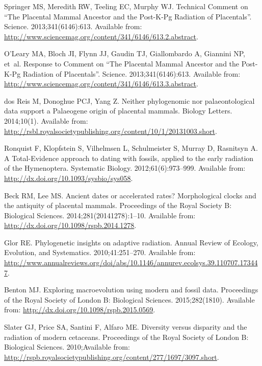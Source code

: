 \documentclass[12pt,letterpaper]{article}
\begin{document}
\begin{thebibliography}{10}
Springer MS, Meredith RW, Teeling EC, Murphy WJ.
\newblock Technical Comment on “The Placental Mammal Ancestor and the
  Post-{K}-{P}g Radiation of Placentals”.
\newblock Science. 2013;341(6146):613.
\newblock Available from:
  \url{http://www.sciencemag.org/content/341/6146/613.2.abstract}.

O'Leary MA, Bloch JI, Flynn JJ, Gaudin TJ, Giallombardo A, Giannini NP, et~al.
\newblock Response to Comment on “The Placental Mammal Ancestor and the
  Post-{K}-{P}g Radiation of Placentals”.
\newblock Science. 2013;341(6146):613.
\newblock Available from:
  \url{http://www.sciencemag.org/content/341/6146/613.3.abstract}.

dos Reis M, Donoghue PCJ, Yang Z.
\newblock Neither phylogenomic nor palaeontological data support a {P}alaeogene
  origin of placental mammals.
\newblock Biology Letters. 2014;10(1).
\newblock Available from:
  \url{http://rsbl.royalsocietypublishing.org/content/10/1/20131003.short}.

Ronquist F, Klopfstein S, Vilhelmsen L, Schulmeister S, Murray D, Rasnitsyn A.
\newblock A {T}otal-{E}vidence approach to dating with fossils, applied to the
  early radiation of the {H}ymenoptera.
\newblock Systematic Biology. 2012;61(6):973--999.
\newblock Available from: \url{http://dx.doi.org/10.1093/sysbio/sys058}.

Beck RM, Lee MS.
\newblock Ancient dates or accelerated rates? {M}orphological clocks and the
  antiquity of placental mammals.
\newblock Proceedings of the Royal Society B: Biological Sciences.
  2014;281(20141278):1--10.
\newblock Available from: \url{http://dx.doi.org/10.1098/rspb.2014.1278}.

Glor RE.
\newblock Phylogenetic insights on adaptive radiation.
\newblock Annual Review of Ecology, Evolution, and Systematics.
  2010;41:251--270.
\newblock Available from:
  \url{http://www.annualreviews.org/doi/abs/10.1146/annurev.ecolsys.39.110707.173447}.

Benton MJ.
\newblock Exploring macroevolution using modern and fossil data.
\newblock Proceedings of the Royal Society of London B: Biological Sciences.
  2015;282(1810).
\newblock Available from: \url{http://dx.doi.org/10.1098/rspb.2015.0569}.

Slater GJ, Price SA, Santini F, Alfaro ME.
\newblock Diversity versus disparity and the radiation of modern cetaceans.
\newblock Proceedings of the Royal Society of London B: Biological Sciences.
  2010;Available from:
  \url{http://rspb.royalsocietypublishing.org/content/277/1697/3097.short}.


\end{thebibliography}
\end{document}
